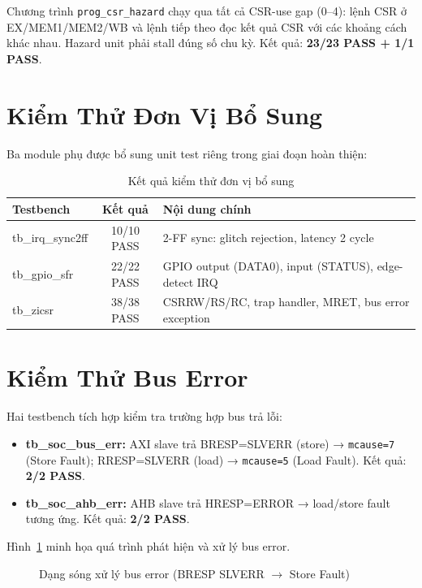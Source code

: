 Chương trình \texttt{prog\_csr\_hazard} chạy qua tất cả CSR-use gap (0--4): lệnh CSR ở EX/MEM1/MEM2/WB và lệnh tiếp theo đọc kết quả CSR với các khoảng cách khác nhau. Hazard unit phải stall đúng số chu kỳ. Kết quả: \textbf{23/23 PASS + 1/1 PASS}.

\section{Kiểm Thử Đơn Vị Bổ Sung}

Ba module phụ được bổ sung unit test riêng trong giai đoạn hoàn thiện:

\begin{table}[htbp]
\caption{Kết quả kiểm thử đơn vị bổ sung}
\label{tab:new-unit-tests}
\begin{center}
\begin{tabular}{|l|c|l|}
\hline
\textbf{Testbench} & \textbf{Kết quả} & \textbf{Nội dung chính} \\ \hline
tb\_irq\_sync2ff & 10/10 PASS & 2-FF sync: glitch rejection, latency 2 cycle \\ \hline
tb\_gpio\_sfr & 22/22 PASS & GPIO output (DATA0), input (STATUS), edge-detect IRQ \\ \hline
tb\_zicsr & 38/38 PASS & CSRRW/RS/RC, trap handler, MRET, bus error exception \\ \hline
\end{tabular}
\end{center}
\end{table}

\section{Kiểm Thử Bus Error}

Hai testbench tích hợp kiểm tra trường hợp bus trả lỗi:

\begin{itemize}
    \item \textbf{tb\_soc\_bus\_err:} AXI slave trả BRESP=SLVERR (store) → \texttt{mcause=7} (Store Fault); RRESP=SLVERR (load) → \texttt{mcause=5} (Load Fault). Kết quả: \textbf{2/2 PASS}.
    \item \textbf{tb\_soc\_ahb\_err:} AHB slave trả HRESP=ERROR → load/store fault tương ứng. Kết quả: \textbf{2/2 PASS}.
\end{itemize}

Hình~\ref{fig:bus-error-waveform} minh họa quá trình phát hiện và xử lý bus error.

\begin{figure}[htp]
\centering
{}
\caption{Dạng sóng xử lý bus error (BRESP SLVERR $\rightarrow$ Store Fault)}
\label{fig:bus-error-waveform}
\end{figure}

